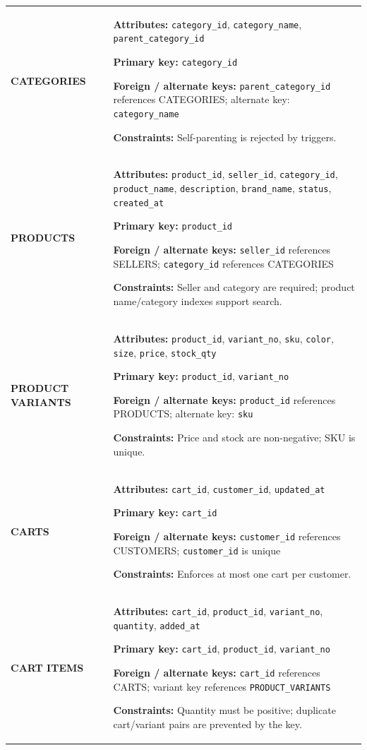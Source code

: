 \documentclass[11pt,a4paper,oneside]{report}
\begin{document}
\begin{longtable}{@{}P{39mm}P{117mm}@{}}
\textbf{CATEGORIES} & \textbf{Attributes:} \texttt{category\_id}, \texttt{category\_name}, \texttt{parent\_category\_id}\par\textbf{Primary key:} \texttt{category\_id}\par\textbf{Foreign / alternate keys:} \texttt{parent\_category\_id} references CATEGORIES; alternate key: \texttt{category\_name}\par\textbf{Constraints:} Self-parenting is rejected by triggers. \\
\textbf{PRODUCTS} & \textbf{Attributes:} \texttt{product\_id}, \texttt{seller\_id}, \texttt{category\_id}, \texttt{product\_name}, \texttt{description}, \texttt{brand\_name}, \texttt{status}, \texttt{created\_at}\par\textbf{Primary key:} \texttt{product\_id}\par\textbf{Foreign / alternate keys:} \texttt{seller\_id} references SELLERS; \texttt{category\_id} references CATEGORIES\par\textbf{Constraints:} Seller and category are required; product name/category indexes support search. \\
\textbf{PRODUCT VARIANTS} & \textbf{Attributes:} \texttt{product\_id}, \texttt{variant\_no}, \texttt{sku}, \texttt{color}, \texttt{size}, \texttt{price}, \texttt{stock\_qty}\par\textbf{Primary key:} \texttt{product\_id}, \texttt{variant\_no}\par\textbf{Foreign / alternate keys:} \texttt{product\_id} references PRODUCTS; alternate key: \texttt{sku}\par\textbf{Constraints:} Price and stock are non-negative; SKU is unique. \\
\textbf{CARTS} & \textbf{Attributes:} \texttt{cart\_id}, \texttt{customer\_id}, \texttt{updated\_at}\par\textbf{Primary key:} \texttt{cart\_id}\par\textbf{Foreign / alternate keys:} \texttt{customer\_id} references CUSTOMERS; \texttt{customer\_id} is unique\par\textbf{Constraints:} Enforces at most one cart per customer. \\
\textbf{CART ITEMS} & \textbf{Attributes:} \texttt{cart\_id}, \texttt{product\_id}, \texttt{variant\_no}, \texttt{quantity}, \texttt{added\_at}\par\textbf{Primary key:} \texttt{cart\_id}, \texttt{product\_id}, \texttt{variant\_no}\par\textbf{Foreign / alternate keys:} \texttt{cart\_id} references CARTS; variant key references \texttt{PRODUCT\_VARIANTS}\par\textbf{Constraints:} Quantity must be positive; duplicate cart/variant pairs are prevented by the key. \\

\end{longtable}
\end{document}
